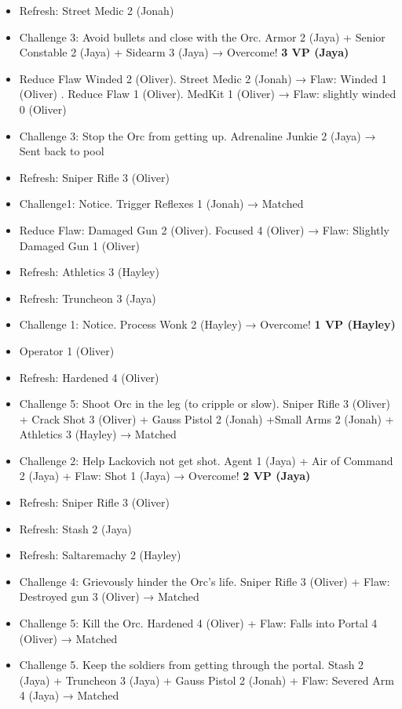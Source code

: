 \begin{itemize}
\item Refresh: Street Medic 2 (Jonah)
\item Challenge 3: Avoid bullets and close with the Orc.  Armor 2 (Jaya) + Senior Constable 2 (Jaya) + Sidearm 3 (Jaya)  → Overcome! \textbf{3 VP (Jaya)}
\item Reduce Flaw Winded 2 (Oliver).  Street Medic 2 (Jonah) → Flaw: Winded 1 (Oliver) {\color[RGB]{255,0,0}. }  Reduce Flaw 1 (Oliver).  MedKit 1 (Oliver) →  {\color[RGB]{255,0,0}Flaw: slightly winded 0 (Oliver)} 
\item Challenge 3: Stop the Orc from getting up.  Adrenaline Junkie 2 (Jaya) → Sent back to pool
\item Refresh: Sniper Rifle 3 (Oliver)
\item Challenge1:  Notice.  Trigger Reflexes 1 (Jonah) → Matched
\item Reduce Flaw: Damaged Gun 2 (Oliver).  Focused 4 (Oliver) →  {\color[RGB]{255,0,0}Flaw: Slightly Damaged Gun 1 (Oliver)} 
\item Refresh: Athletics 3 (Hayley)
\item Refresh: Truncheon 3 (Jaya)
\item Challenge 1: Notice.  Process Wonk 2 (Hayley)   → Overcome! \textbf{1 VP (Hayley)}
\item Operator 1 (Oliver)
\item Refresh: Hardened 4 (Oliver)
\item Challenge 5: Shoot Orc in the leg (to cripple or slow).  Sniper Rifle 3 (Oliver) + Crack Shot 3 (Oliver) + Gauss Pistol 2 (Jonah) +Small Arms 2 (Jonah) + Athletics 3 (Hayley)  → Matched
\item Challenge 2: Help Lackovich not get shot.  Agent 1  (Jaya) + Air of Command 2  (Jaya) + Flaw: Shot 1 (Jaya)  → Overcome! \textbf{2 VP (Jaya)}
\item Refresh: Sniper Rifle 3 (Oliver)
\item Refresh: Stash 2 (Jaya)
\item Refresh: Saltaremachy 2 (Hayley)
\item Challenge 4: Grievously hinder the Orc's life.  Sniper Rifle 3 (Oliver) +  {\color[RGB]{255,0,0}Flaw: Destroyed gun 3 (Oliver) } → Matched
\item Challenge 5: Kill the Orc.  Hardened 4 (Oliver) +  {\color[RGB]{255,0,0}Flaw: Falls into Portal 4 (Oliver) } → Matched
\item Challenge 5.  Keep the soldiers from getting through the portal.  Stash 2 (Jaya) + Truncheon 3 (Jaya) + Gauss Pistol 2 (Jonah) +  {\color[RGB]{255,0,0}Flaw: Severed Arm 4 (Jaya)}  → Matched

\end{itemize}
